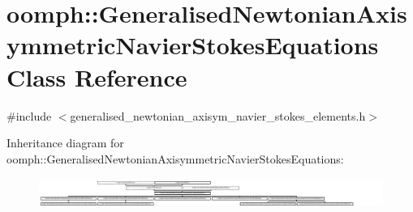 \hypertarget{classoomph_1_1GeneralisedNewtonianAxisymmetricNavierStokesEquations}{}\section{oomph\+:\+:Generalised\+Newtonian\+Axisymmetric\+Navier\+Stokes\+Equations Class Reference}
\label{classoomph_1_1GeneralisedNewtonianAxisymmetricNavierStokesEquations}


{\ttfamily \#include $<$generalised\+\_\+newtonian\+\_\+axisym\+\_\+navier\+\_\+stokes\+\_\+elements.\+h$>$}

Inheritance diagram for oomph\+:\+:Generalised\+Newtonian\+Axisymmetric\+Navier\+Stokes\+Equations\+:\begin{figure}[H]
\begin{center}
\leavevmode
\includegraphics[height=0.997151cm]{classoomph_1_1GeneralisedNewtonianAxisymmetricNavierStokesEquations}
\end{center}
\end{figure}
